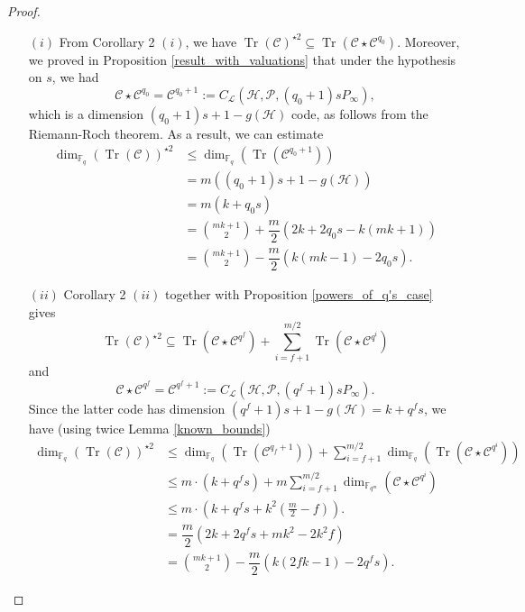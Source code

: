 \documentclass[a4paper]{article}
\newcommand{\calP}{\mathcal{P}}
\newcommand{\calH}{\mathcal{H}}
\newcommand{\calL}{\mathcal{L}}
\newcommand{\calC}{\mathcal{C}}
\newcommand{\Tr}{\operatorname{Tr}}
\newcommand{\fqm}{\mathbb{F}_{q^m}}
\newcommand{\fq}{\mathbb{F}_{q}}
\begin{document}
\begin{proof}
\begin{itemize}
    \item[$(i)$] From Corollary 2 $(i)$, we have $\Tr(\calC)^{\star 2} \subseteq \Tr(\calC \star \calC^{q_0}).$ Moreover, we proved in Proposition \ref{result_with_valuations} that under the hypothesis on $s$, we had
      \[ \calC \star \calC^{q_0} = \calC^{q_0+1} := C_{\calL}(\calH,\calP,(q_0+1)sP_{\infty}),\]
      which is a dimension $(q_0+1)s + 1 - g(\calH)$ code, as follows from the Riemann-Roch theorem. As a result, we can estimate
      \begin{align*}
           \dim_{\fq}(\Tr(\calC))^{\star 2} &\leq \dim_{\fq}(\Tr(\calC^{q_0+1})) \\
                                            & = m((q_0+1)s + 1 - g(\calH)) \\
                                            & = m (k+q_0 s) \\
                                            & = \binom{mk+1}{2} + \dfrac{m}{2}(2k+2q_0s-k(mk+1)) \\
                                            &= \binom{mk+1}{2} - \dfrac{m}{2} (k(mk-1)-2q_0s).
      \end{align*}
      \item[$(ii)$] Corollary 2 $(ii)$ together with Proposition \ref{powers_of_q's_case} gives 
       \[\Tr(\calC)^{\star 2} \subseteq \Tr(\calC \star \calC^{q^f}) + \sum\limits_{i=f+1}^{m/2} \Tr(\calC \star \calC^{q^i})\]
       and 
        \[ \calC \star \calC^{q^f} = \calC^{q^f+1} := C_{\calL}(\calH,\calP,(q^f+1)sP_{\infty}).\]
        Since the latter code has dimension $(q^f+1)s+1-g(\calH)=k+q^fs$, we have (using twice Lemma \ref{known_bounds})
         \begin{align*}
           \dim_{\fq}(\Tr(\calC))^{\star 2} &\leq \dim_{\fq}(\Tr(\calC^{q_f+1})) +  \sum\limits_{i=f+1}^{m/2} \dim_{\fq}(\Tr(\calC \star \calC^{q^i}))\\
                                            &\leq m \cdot (k + q^fs) + m  \sum\limits_{i=f+1}^{m/2} \dim_{\fqm}(\calC \star \calC^{q^i}) \\
                                            &\leq m \cdot \left(k+q^fs + k^2 \left(\frac{m}{2}-f\right)\right). \\
                                            &= \dfrac{m}{2}(2k+2q^fs+mk^2-2k^2f) \\
                                         &=\binom{mk+1}{2}-\dfrac{m}{2}(k(2fk-1)-2q^fs).
      \end{align*}
\end{itemize}
\end{proof}
\end{document}
